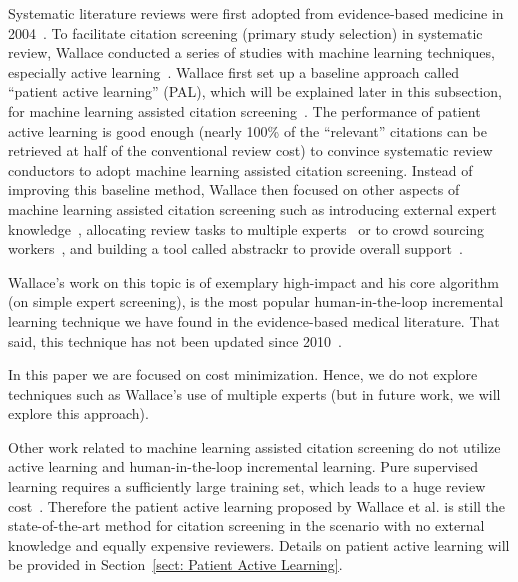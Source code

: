 \documentclass{svjour3}
\theoremstyle{break}
\begin{document}
Systematic literature reviews were first adopted from evidence-based medicine in
2004~\cite{kitchenham2004evidence}. To facilitate citation screening (primary
study selection) in systematic review, Wallace conducted a series of studies
with machine learning techniques, especially active
learning~\cite{wallace2010semi,wallace2010active,wallace2011should,wallace2012deploying,wallace2013active,wallace2013modernizing,nguyen2015combining}. Wallace
first set up a baseline approach called ``patient active learning'' (PAL), which will be explained later in this subsection, for machine learning assisted citation
screening~\cite{wallace2010semi}. The performance of patient active learning
is good enough (nearly 100\% of the ``relevant''
citations can be retrieved at half of the conventional review cost) to convince
systematic review conductors to adopt machine learning assisted citation
screening. Instead of improving this baseline method, Wallace then focused on other aspects of machine learning assisted citation screening such as introducing external expert knowledge~\cite{wallace2010active}, allocating review tasks to multiple experts~\cite{wallace2011should} or to crowd sourcing workers~\cite{nguyen2015combining}, and building a tool called abstrackr to provide overall support~\cite{wallace2012deploying}. 

Wallace's work on this topic is of  
exemplary high-impact and
 his core algorithm   (on simple expert screening),   is   the most
popular human-in-the-loop incremental learning technique we have found in the
evidence-based medical literature. That said,
this technique has not been updated   since 2010~\cite{wallace2010semi}.

In this paper we are focused on cost minimization. Hence, we do not explore
techniques such as Wallace's use of multiple experts (but in future work,
we will explore this approach).

Other work related to machine learning assisted citation screening do not
utilize active learning and human-in-the-loop incremental learning. Pure supervised learning
requires a sufficiently large training set, which leads to a huge review
cost~\cite{cohen2006reducing,adeva2014automatic}. Therefore the patient active
learning proposed by Wallace et al. is still the state-of-the-art method for
citation screening in the scenario with no external knowledge and equally
expensive reviewers. Details on patient active learning will be provided in Section~\ref{sect: Patient Active Learning}.
\end{document}
